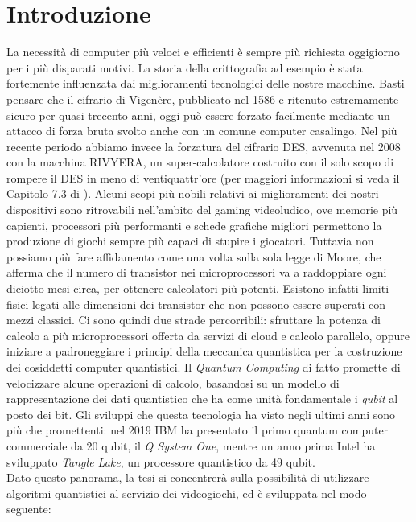 \documentclass{book}
\theoremstyle{definition}
\theoremstyle{definition}
\theoremstyle{definition}
\theoremstyle{plain}
\theoremstyle{plain}
\theoremstyle{plain}
\theoremstyle{plain}
\begin{document}
\chapter*{Introduzione}
La necessità di computer più veloci e efficienti è sempre più richiesta oggigiorno per i più disparati motivi. La storia della crittografia ad esempio è stata fortemente influenzata dai miglioramenti tecnologici delle nostre macchine. Basti pensare che il cifrario di Vigenère, pubblicato nel 1586 e ritenuto estremamente sicuro per quasi trecento anni, oggi può essere forzato facilmente mediante un attacco di forza bruta svolto anche con un comune computer casalingo. Nel più recente periodo abbiamo invece la forzatura del cifrario DES, avvenuta nel 2008 con la macchina RIVYERA, un super-calcolatore costruito con il solo scopo di rompere il DES in meno di ventiquattr'ore (per maggiori informazioni si veda il Capitolo 7.3 di \cite{elementi_di_crittografia}). Alcuni scopi più nobili relativi ai miglioramenti dei nostri dispositivi sono ritrovabili nell'ambito del gaming videoludico, ove memorie più capienti, processori più performanti e schede grafiche migliori permettono la produzione di giochi sempre più capaci di stupire i giocatori. Tuttavia non possiamo più fare affidamento come una volta sulla sola legge di Moore\cite{wiki:Legge_di_Moore}, che afferma che il numero di transistor nei microprocessori va a raddoppiare ogni diciotto mesi circa, per ottenere calcolatori più potenti. Esistono infatti limiti fisici legati alle dimensioni dei transistor che non possono essere superati con mezzi classici. Ci sono quindi due strade percorribili: sfruttare la potenza di calcolo a più microprocessori offerta da servizi di cloud e calcolo parallelo, oppure iniziare a padroneggiare i principi della meccanica quantistica per la costruzione dei cosiddetti computer quantistici.
Il \textit{Quantum Computing} di fatto promette di velocizzare alcune operazioni di calcolo, basandosi su un modello di rappresentazione dei dati quantistico che ha come unità fondamentale i \textit{qubit} al posto dei bit. Gli sviluppi che questa tecnologia ha visto negli ultimi anni sono più che promettenti: nel 2019 IBM ha presentato il primo quantum computer commerciale da 20 qubit, il \emph{Q System One}\cite{wiki:IBM_Q_System_One}, mentre un anno prima Intel ha sviluppato \emph{Tangle Lake}, un processore quantistico da 49 qubit\cite{intel_quantum}.\\
Dato questo panorama, la tesi si concentrerà sulla possibilità di utilizzare algoritmi quantistici al servizio dei videogiochi, ed è sviluppata nel modo seguente:
\end{document}
